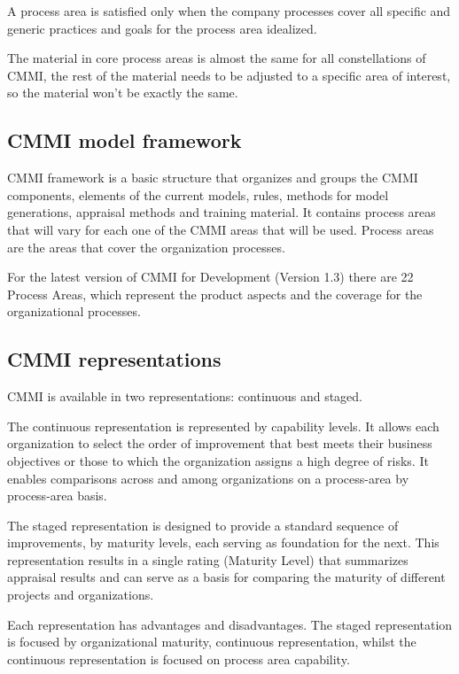 A process area is satisfied only when the company processes cover all specific and generic practices and goals for the process area idealized.

The material in core process areas is almost the same for all constellations of CMMI, the rest of the material needs to be adjusted to a specific area of interest, so the material won't be exactly the same.



\subsection{CMMI model framework}
CMMI framework is a basic structure that organizes and groups the CMMI components, elements of the current models, rules, methods for model generations, appraisal methods and training material. It contains process areas that will vary for each one of the CMMI areas that will be used. Process areas are the areas that cover the organization processes.

For the latest version of CMMI for Development (Version 1.3) there are 22 Process Areas, which represent the product aspects and the coverage for the organizational processes.


\subsection{CMMI representations}

CMMI is available in two representations: continuous and staged.

The continuous representation is represented by capability levels. It allows each organization to select the order of improvement that best meets their business objectives or those to which the organization assigns a high degree of risks. It enables comparisons across and among organizations on a process-area by process-area basis.


The staged representation is designed to provide a standard sequence of improvements, by maturity levels, each serving as foundation for the next. This representation results in a single rating (Maturity Level) that summarizes appraisal results and can serve as a basis for comparing the maturity of different projects and organizations.

Each representation has advantages and disadvantages. The staged representation is focused by organizational maturity, continuous representation, whilst the continuous representation is focused on process area capability.

